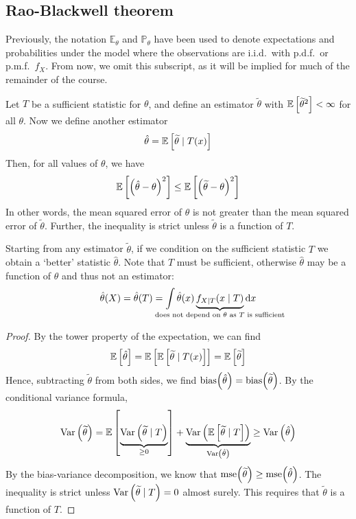 \subsection{Rao-Blackwell theorem}
Previously, the notation \( \mathbb E_\theta \) and \( \mathbb P_\theta \) have been used to denote expectations and probabilities under the model where the observations are i.i.d.\ with p.d.f.\ or p.m.f.\ \( f_X \).
From now, we omit this subscript, as it will be implied for much of the remainder of the course.
\begin{theorem}
	Let \( T \) be a sufficient statistic for \( \theta \), and define an estimator \( \widetilde \theta \) with \( \mathbb{E}\left[{{\widetilde \theta}^2}\right] < \infty \) for all \( \theta \).
	Now we define another estimator
	\[
		\hat \theta = \mathbb{E}\left[{\widetilde \theta \mid T(x)}\right]
	\]
	Then, for all values of \( \theta \), we have
	\[
		\mathbb{E}\left[{\qty(\hat \theta - \theta)^2}\right] \leq \mathbb{E}\left[{\qty(\widetilde \theta - \theta)^2}\right]
	\]
	In other words, the mean squared error of \( \hat \theta \) is not greater than the mean squared error of \( \widetilde \theta \).
	Further, the inequality is strict unless \( \widetilde \theta \) is a function of \( T \).
\end{theorem}
\begin{remark}
	Starting from any estimator \( \widetilde \theta \), if we condition on the sufficient statistic \( T \) we obtain a `better' statistic \( \hat \theta \).
	Note that \( T \) must be sufficient, otherwise \( \hat \theta \) may be a function of \( \theta \) and thus not an estimator:
	\[
		\hat \theta(X) = \hat \theta(T) = \int \hat \theta(x) \underbrace{f_{X \mid T}(x \mid T)}_{\mathclap{\text{does not depend on } \theta \text{ as } T \text{ is sufficient}}} \dd{x}
	\]
\end{remark}
\begin{proof}
	By the tower property of the expectation, we can find
	\[
		\mathbb{E}\left[{\hat \theta}\right] = \mathbb{E}\left[{\mathbb{E}\left[{\widetilde \theta \mid T(x)}\right]}\right] = \mathbb{E}\left[{\widetilde \theta}\right]
	\]
	Hence, subtracting \( \widetilde \theta \) from both sides, we find \( \mathrm{bias}\qty(\hat\theta) = \mathrm{bias}\qty(\widetilde\theta) \).
	By the conditional variance formula,
	\[
		\operatorname{Var}\left({\widetilde \theta}\right) = \mathbb{E}\left[{\underbrace{\operatorname{Var}\left({\widetilde \theta \mid T}\right)}_{\geq 0}}\right] + \underbrace{\operatorname{Var}\left({\mathbb{E}\left[{\widetilde \theta \mid T}\right]}\right)}_{\operatorname{Var}\left({\hat\theta}\right)} \geq \operatorname{Var}\left({\hat \theta}\right)
	\]
	By the bias-variance decomposition, we know that \( \mathrm{mse}\qty(\widetilde \theta) \geq \mathrm{mse}\qty(\hat \theta) \).
	The inequality is strict unless \( \operatorname{Var}\left({\widetilde \theta \mid T}\right) = 0 \) almost surely.
	This requires that \( \widetilde \theta \) is a function of \( T \).
\end{proof}

